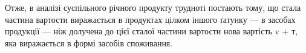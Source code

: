 Отже, в аналізі суспільного річного продукту трудноті постають тому,
що стала частина вартости виражається в продуктах цілком іншого ґатунку
— в засобах продукції — ніж долучена до цієї сталої частини
вартости нова вартість v + т, яка виражається в формі засобів споживання.
\parbreak{}  %
